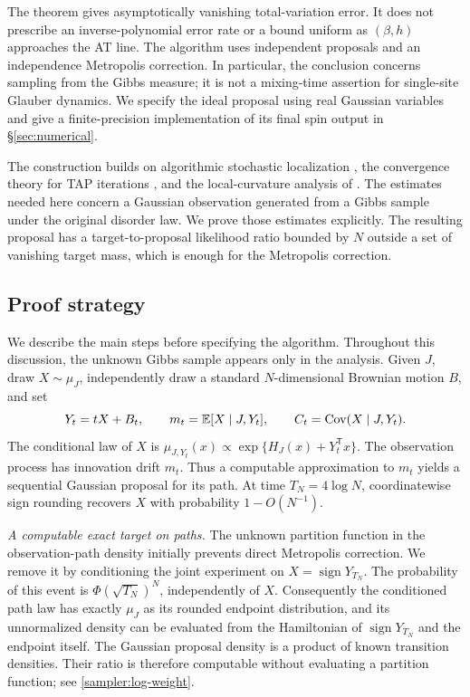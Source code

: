 \documentclass[11pt,reqno]{amsart}
\newcommand{\Cov}{\operatorname{Cov}}
\newcommand{\sign}{\operatorname{sign}}
\begin{document}
The theorem gives asymptotically vanishing total-variation error. It does not prescribe an inverse-polynomial error rate or a bound uniform as $(\beta,h)$ approaches the AT line. The algorithm uses independent proposals and an independence Metropolis correction. In particular, the conclusion concerns sampling from the Gibbs measure; it is not a mixing-time assertion for single-site Glauber dynamics. We specify the ideal proposal using real Gaussian variables and give a finite-precision implementation of its final spin output in \S\ref{sec:numerical}.

The construction builds on algorithmic stochastic localization \cite{el2022sampling,montanari2023posterior}, the convergence theory for TAP iterations \cite{bolthausen2014iterative,chen2021convergence}, and the local-curvature analysis of \cite{brennecke2023operator,celentano2024sudakov}. The estimates needed here concern a Gaussian observation generated from a Gibbs sample under the original disorder law. We prove those estimates explicitly. The resulting proposal has a target-to-proposal likelihood ratio bounded by $N$ outside a set of vanishing target mass, which is enough for the Metropolis correction.

\subsection{Proof strategy}\label{sec:proof-overview}

We describe the main steps before specifying the algorithm. Throughout this discussion, the unknown Gibbs sample appears only in the analysis. Given $J$, draw $X\sim\mu_J$, independently draw a standard $N$-dimensional Brownian motion $B$, and set
\begin{equation}\label{eq:observation-process}
 Y_t=tX+B_t,\qquad
 m_t=\bbE[X\mid J,Y_t],\qquad
 C_t=\Cov(X\mid J,Y_t).
\end{equation}
The conditional law of $X$ is $\mu_{J,Y_t}(x)\propto\exp\{H_J(x)+Y_t^{\mathsf T}x\}$. The observation process has innovation drift $m_t$. Thus a computable approximation to $m_t$ yields a sequential Gaussian proposal for its path. At time $T_N=4\log N$, coordinatewise sign rounding recovers $X$ with probability $1-O(N^{-1})$.

\emph{A computable exact target on paths.}
The unknown partition function in the observation-path density initially prevents direct Metropolis correction. We remove it by conditioning the joint experiment on $X=\sign Y_{T_N}$. The probability of this event is $\Phi(\sqrt{T_N})^N$, independently of $X$. Consequently the conditioned path law has exactly $\mu_J$ as its rounded endpoint distribution, and its unnormalized density can be evaluated from the Hamiltonian of $\sign Y_{T_N}$ and the endpoint itself. The Gaussian proposal density is a product of known transition densities. Their ratio is therefore computable without evaluating a partition function; see \eqref{sampler:log-weight}.
\end{document}
